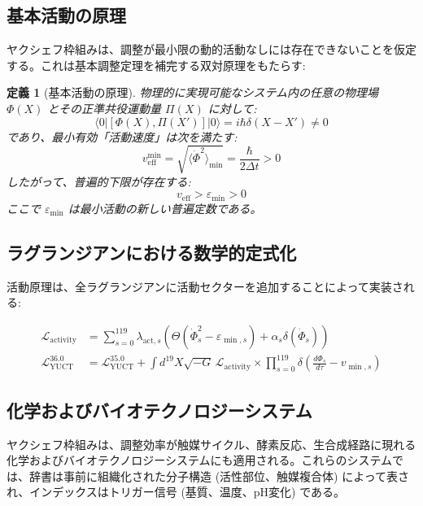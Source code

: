 \documentclass[11pt,a4paper]{article}
\newtheorem{definition}{定義}
\begin{document}
	\subsection{基本活動の原理}
	
	ヤクシェフ枠組みは、調整が最小限の動的活動なしには存在できないことを仮定する。これは基本調整定理を補完する双対原理をもたらす:
	
	\begin{definition}[基本活動の原理]
		物理的に実現可能なシステム内の任意の物理場 $\Phi(X)$ とその正準共役運動量 $\Pi(X)$ に対して:
		\[
		\langle 0 | [\Phi(X), \Pi(X')] | 0 \rangle = i\hbar\delta(X-X') \neq 0
		\]
		であり、最小有効「活動速度」は次を満たす:
		\[
		v_{\mathrm{eff}}^{\min} = \sqrt{\langle \dot{\Phi}^2 \rangle_{\min}} = \frac{\hbar}{2\Delta t} > 0
		\]
		したがって、普遍的下限が存在する:
		\[
		\boxed{v_{\mathrm{eff}} > \varepsilon_{\min} > 0}
		\]
		ここで $\varepsilon_{\min}$ は最小活動の新しい普遍定数である。
	\end{definition}
	
	\subsection{ラグランジアンにおける数学的定式化}
	
	活動原理は、全ラグランジアンに活動セクターを追加することによって実装される:
	
	\begin{align}
		\mathcal{L}_{\mathrm{activity}} &= \sum_{s=0}^{119} \lambda_{\mathrm{act},s} \left( \Theta(\dot{\Phi}_s^2 - \varepsilon_{\min,s}) + \alpha_s \delta(\dot{\Phi}_s) \right) \\
		\mathcal{L}_{\mathrm{YUCT}}^{36.0} &= \mathcal{L}_{\mathrm{YUCT}}^{35.0} + \int d^{19}X \sqrt{-G} \, \mathcal{L}_{\mathrm{activity}} \times \prod_{s=0}^{119} \delta\left( \frac{d\Phi_s}{d\tau} - v_{\min,s} \right)
	\end{align}
	
	\subsection{化学およびバイオテクノロジーシステム}
	\label{subsec:chemical-systems}
	
	ヤクシェフ枠組みは、調整効率が触媒サイクル、酵素反応、生合成経路に現れる化学およびバイオテクノロジーシステムにも適用される。これらのシステムでは、辞書は事前に組織化された分子構造 (活性部位、触媒複合体) によって表され、インデックスはトリガー信号 (基質、温度、pH変化) である。
	
\end{document}
